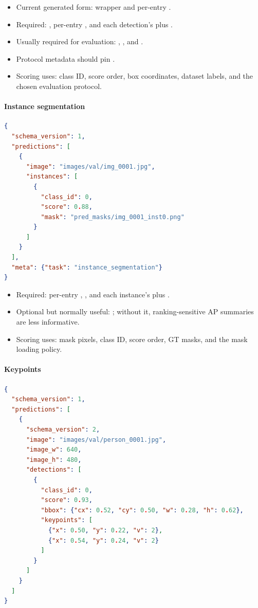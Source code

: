 \begin{itemize}
  \item Current generated form: wrapper  and per-entry .
  \item Required: , per-entry , and each detection's  plus .
  \item Usually required for evaluation: , , and .
  \item Protocol metadata should pin .
  \item Scoring uses: class ID, score order, box coordinates, dataset labels, and the chosen evaluation protocol.
\end{itemize}

\paragraph{Instance segmentation}\mbox{}\par
\begin{lstlisting}[language=json,basicstyle=\ttfamily\footnotesize]
{
  "schema_version": 1,
  "predictions": [
    {
      "image": "images/val/img_0001.jpg",
      "instances": [
        {
          "class_id": 0,
          "score": 0.88,
          "mask": "pred_masks/img_0001_inst0.png"
        }
      ]
    }
  ],
  "meta": {"task": "instance_segmentation"}
}
\end{lstlisting}

\begin{itemize}
  \item Required: per-entry , , and each instance's  plus .
  \item Optional but normally useful: ; without it, ranking-sensitive AP summaries are less informative.
  \item Scoring uses: mask pixels, class ID, score order, GT masks, and the mask loading policy.
\end{itemize}

\paragraph{Keypoints}\mbox{}\par
\begin{lstlisting}[language=json,basicstyle=\ttfamily\footnotesize]
{
  "schema_version": 1,
  "predictions": [
    {
      "schema_version": 2,
      "image": "images/val/person_0001.jpg",
      "image_w": 640,
      "image_h": 480,
      "detections": [
        {
          "class_id": 0,
          "score": 0.93,
          "bbox": {"cx": 0.52, "cy": 0.50, "w": 0.28, "h": 0.62},
          "keypoints": [
            {"x": 0.50, "y": 0.22, "v": 2},
            {"x": 0.54, "y": 0.24, "v": 2}
          ]
        }
      ]
    }
  ]
}
\end{lstlisting}

